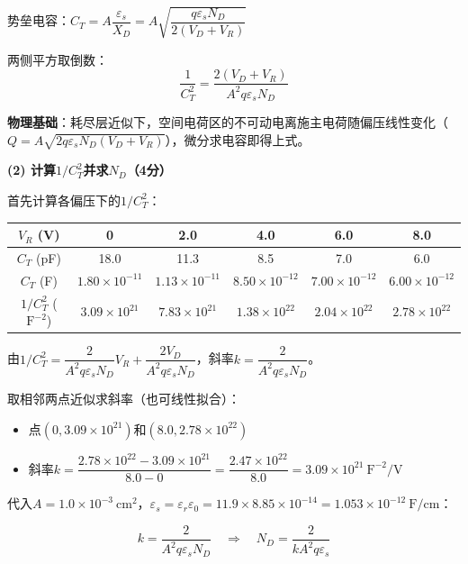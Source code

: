 \documentclass[12pt,a4paper]{ctexart}
\begin{document}
势垒电容：$C_T = A\dfrac{\varepsilon_s}{X_D} = A\sqrt{\dfrac{q\varepsilon_s N_D}{2(V_D + V_R)}}$

两侧平方取倒数：
\[
\boxed{\frac{1}{C_T^2} = \frac{2(V_D + V_R)}{A^2 q \varepsilon_s N_D}}
\]

\textbf{物理基础}：耗尽层近似下，空间电荷区的不可动电离施主电荷随偏压线性变化（$Q = A\sqrt{2q\varepsilon_s N_D (V_D + V_R)}$），微分求电容即得上式。

\vspace{8pt}

\noindent\textbf{(2) 计算$1/C_T^2$并求$N_D$（4分）}

首先计算各偏压下的$1/C_T^2$：

\begin{center}
\begin{tabular}{c|ccccc}
\toprule
$V_R$ (V) & 0 & 2.0 & 4.0 & 6.0 & 8.0 \\
\midrule
$C_T$ (pF) & 18.0 & 11.3 & 8.5 & 7.0 & 6.0 \\
\midrule
$C_T$ (F) & $1.80\!\times\!10^{-11}$ & $1.13\!\times\!10^{-11}$ & $8.50\!\times\!10^{-12}$ & $7.00\!\times\!10^{-12}$ & $6.00\!\times\!10^{-12}$ \\
\midrule
$1/C_T^2$ ($\text{F}^{-2}$) & $3.09\!\times\!10^{21}$ & $7.83\!\times\!10^{21}$ & $1.38\!\times\!10^{22}$ & $2.04\!\times\!10^{22}$ & $2.78\!\times\!10^{22}$ \\
\bottomrule
\end{tabular}
\end{center}

由$1/C_T^2 = \dfrac{2}{A^2 q \varepsilon_s N_D} V_R + \dfrac{2V_D}{A^2 q \varepsilon_s N_D}$，斜率$k = \dfrac{2}{A^2 q \varepsilon_s N_D}$。

取相邻两点近似求斜率（也可线性拟合）：

\begin{itemize}[nosep]
\item 点$(0, 3.09\!\times\!10^{21})$和$(8.0, 2.78\!\times\!10^{22})$
\item 斜率$k = \dfrac{2.78 \times 10^{22} - 3.09 \times 10^{21}}{8.0 - 0} = \dfrac{2.47 \times 10^{22}}{8.0} = 3.09 \times 10^{21}\ \text{F}^{-2}/\text{V}$
\end{itemize}

代入$A = 1.0 \times 10^{-3}\ \text{cm}^2$，$\varepsilon_s = \varepsilon_r\varepsilon_0 = 11.9 \times 8.85 \times 10^{-14} = 1.053 \times 10^{-12}\ \text{F/cm}$：

\[
k = \frac{2}{A^2 q \varepsilon_s N_D} \quad\Rightarrow\quad
N_D = \frac{2}{k A^2 q \varepsilon_s}
\]
\end{document}
